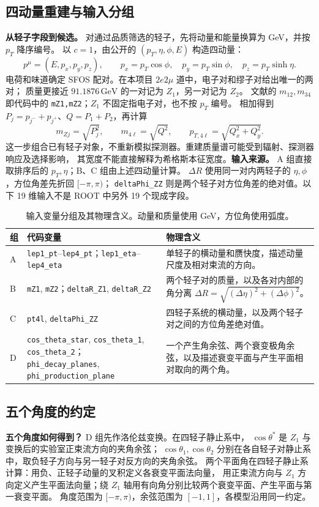 \documentclass[11pt,a4paper,fontset=fandol,scheme=plain]{ctexart}
\newcommand{\gev}{\,\mathrm{GeV}}
\begin{document}
\subsection{四动量重建与输入分组}
\textbf{从轻子字段到候选。} 对通过品质筛选的轻子，先将动量和能量换算为 GeV，并按 $p_T$ 降序编号。
以 $c=1$，由公开的 $(p_T,\eta,\phi,E)$ 构造四动量：
\[
 p^\mu=(E,p_x,p_y,p_z),\qquad
 p_x=p_T\cos\phi,\quad p_y=p_T\sin\phi,\quad p_z=p_T\sinh\eta.
\]
电荷和味道确定 SFOS 配对。在本项目 $2e2\mu$ 道中，电子对和缪子对给出唯一的两对；
质量更接近 $91.1876\gev$ 的一对记为 $Z_1$，另一对记为 $Z_2$。
文献的 $m_{12},m_{34}$ 即代码中的 \texttt{mZ1,mZ2}；$Z_1$ 不固定指电子对，也不按 $p_T$ 编号。
相加得到 $P_j=p_{j^-}+p_{j^+}$、$Q=P_1+P_2$，再计算
\[
 m_{Zj}=\sqrt{P_j^2},\qquad m_{4\ell}=\sqrt{Q^2},\qquad
 p_{T,4\ell}=\sqrt{Q_x^2+Q_y^2}.
\]
这一步组合已有轻子对象，不重新模拟探测器。重建质量谱可能受到辐射、探测器响应及选择影响，
其宽度不能直接解释为希格斯本征宽度。\textbf{输入来源。} A 组直接取排序后的 $p_T,\eta$；B、C 组由上述四动量计算。
$\Delta R$ 使用同一对内两轻子的 $\eta,\phi$，方位角差先折回 $[-\pi,\pi)$；
\texttt{deltaPhi\_ZZ} 则是两个轻子对方位角差的绝对值。以下 19 维输入不是 ROOT 中另外 19 个现成字段。\begin{table}[H]
\caption{输入变量分组及其物理含义。动量和质量使用 GeV，方位角使用弧度。}
\label{tab:features}
\small
\renewcommand{\arraystretch}{1.12}
\begin{tabularx}{\linewidth}{@{}p{.05\linewidth}p{.43\linewidth}Y@{}}
\toprule
组 & 代码变量 & 物理含义 \\
\midrule
A & \texttt{lep1\_pt}--\texttt{lep4\_pt}；\texttt{lep1\_eta}--\texttt{lep4\_eta} &
单轻子的横动量和赝快度，描述动量尺度及相对束流的方向。 \\
B & \texttt{mZ1}, \texttt{mZ2}；\texttt{deltaR\_Z1}, \texttt{deltaR\_Z2} &
两个轻子对的质量，以及各对内部的角分离 $\Delta R=\sqrt{(\Delta\eta)^2+(\Delta\phi)^2}$。 \\
C & \texttt{pt4l}, \texttt{deltaPhi\_ZZ} &
四轻子系统的横动量，以及两个轻子对之间的方位角差绝对值。 \\
D & \texttt{cos\_theta\_star}, \texttt{cos\_theta\_1}, \texttt{cos\_theta\_2}；
\texttt{phi\_decay\_planes}, \texttt{phi\_production\_plane} &
一个产生角余弦、两个衰变极角余弦，以及描述衰变平面与产生平面相对取向的两个角。 \\
\bottomrule
\end{tabularx}
\end{table}
\subsection{五个角度的约定}
\textbf{五个角度如何得到？} D 组先作洛伦兹变换。在四轻子静止系中，
$\cos\theta^*$ 是 $Z_1$ 与变换后的实验室正束流方向的夹角余弦；
$\cos\theta_1,\cos\theta_2$ 分别在各自轻子对静止系中，取负轻子方向与另一轻子对反方向的夹角余弦。
两个平面角在四轻子静止系计算：用负、正轻子动量的叉积定义各衰变平面法向量，
用正束流方向与 $Z_1$ 方向定义产生平面法向量；绕 $Z_1$ 轴用有向角分别比较两个衰变平面、产生平面与第一衰变平面。
角度范围为 $[-\pi,\pi)$，余弦范围为 $[-1,1]$，各模型沿用同一约定。
\FloatBarrier
\end{document}
